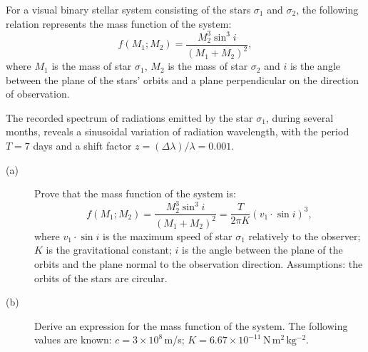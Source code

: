 For a visual binary stellar system consisting of the stars $\sigma_1$ and
$\sigma_2$, the following relation represents the mass function of the
system:
\[ f(M_1; M_2) = \frac{M_2^3 \sin^3 i}{(M_1 + M_2)^2}, \]
where $M_1$ is the mass of star $\sigma_1$, $M_2$ is the mass of star
$\sigma_2$ and $i$ is the angle between the plane of the stars' orbits and a
plane perpendicular on the direction of observation.

The recorded spectrum of radiations emitted by the star $\sigma_1$, during
several months, reveals a sinusoidal variation of radiation wavelength, with
the period $T = 7$ days and a shift factor
$z = (\Delta\lambda)/\lambda = 0.001$.

\begin{description}
\item[(a)] Prove that the mass function of the system is:
  \[ f(M_1; M_2) = \frac{M_2^3 \sin^3 i}{(M_1 + M_2)^2}
     = \frac{T}{2\pi K} \left( v_1 \cdot \sin i \right)^3, \]
  where $v_1 \cdot \sin i$ is the maximum speed of star $\sigma_1$ relatively
  to the observer; $K$ is the gravitational constant; $i$ is the angle
  between the plane of the orbits and the plane normal to the observation
  direction. Assumptions: the orbits of the stars are circular.
\item[(b)] Derive an expression for the mass function of the system. The
  following values are known: $c = 3 \times 10^8$\,m/s;
  $K = 6.67 \times 10^{-11}\,\mathrm{N\,m^2\,kg^{-2}}$.
\end{description}
